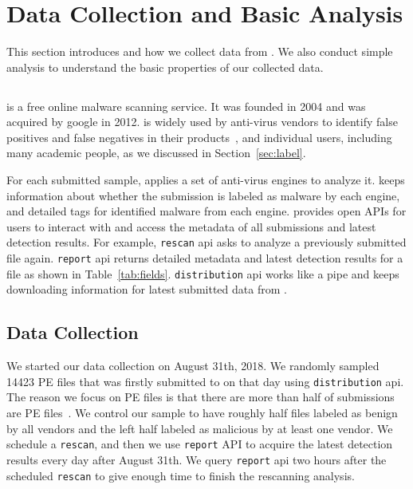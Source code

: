 \section{Data Collection and Basic Analysis}
\label{sec:data}



This section introduces \vt{} and how we collect data from \vt{}. 
We also conduct simple analysis to understand 
the basic properties of our collected data. 

\subsection{\vt{}}
\vt{} is a free online malware scanning service. 
It was founded in 2004 and was acquired by google in 2012. 
\vt{} is widely used by anti-virus vendors to identify false positives and false negatives 
in their products~\cite{huangvt2016bigdata, neeles}, 
and individual users, including many academic people, 
as we discussed in Section~\ref{sec:label}.

For each submitted sample, \vt{} applies a set of anti-virus engines to analyze it. 
\vt{} keeps information about whether the submission is labeled as malware by each engine, 
and detailed tags for identified malware from each engine. 
\vt{} provides open APIs for users to interact with \vt{} 
and access the metadata of all submissions and latest detection results.
For example, \texttt{rescan} api asks \vt{} to analyze a previously submitted file again. 
\texttt{report} api returns detailed metadata and latest detection results 
for a file as shown in Table~\ref{tab:fields}. 
\texttt{distribution} api works like a pipe and keeps 
downloading information for latest submitted data from \vt{}. 



\subsection{Data Collection}

We started our data collection on August 31th, 2018. 
We randomly sampled 14423 PE files that was firstly submitted to \vt{} 
on that day using \texttt{distribution} api.
The reason we focus on PE files is that there are more 
than half of \vt{} submissions are PE files~\cite{SongAPsys2016}. 
We control our sample to have roughly 
half files labeled as benign by all vendors 
and the left half labeled as malicious by at least one vendor.
We schedule a \texttt{rescan}, and then we use \texttt{report} API to acquire
the latest detection results every day after August 31th. 
We query \texttt{report} api two hours after the scheduled \texttt{rescan} to give 
\vt{} enough time to finish the rescanning analysis. 

